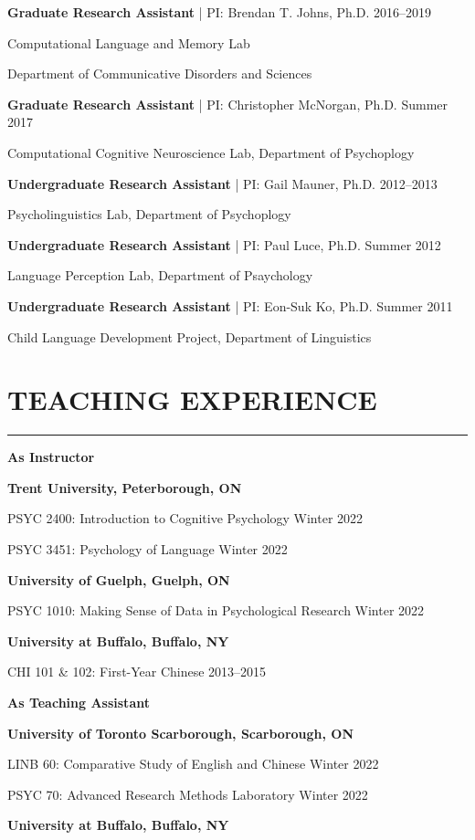 \documentclass[11pt]{article}
\newcommand{\cvsection}[1]{\vspace{-0.2cm}\section*{\Large #1}\vspace{-0.2cm}\hrule\vspace{0.2cm}}
\newcommand{\h}[1]{\hspace{15pt} #1}
\begin{document}
\textbf{Graduate Research Assistant} | PI: Brendan T. Johns, Ph.D. \hfill 2016--2019

\h{Computational Language and Memory Lab}

\h{Department of Communicative Disorders and Sciences}

\textbf{Graduate Research Assistant} | PI: Christopher McNorgan, Ph.D. \hfill Summer 2017

\h{Computational Cognitive Neuroscience Lab, Department of Psychoplogy}

\textbf{Undergraduate Research Assistant} | PI: Gail Mauner, Ph.D. \hfill 2012--2013

\h{Psycholinguistics Lab, Department of Psychoplogy}

\textbf{Undergraduate Research Assistant} | PI: Paul Luce, Ph.D. \hfill Summer 2012

\h{Language Perception Lab, Department of Psaychology}

\textbf{Undergraduate Research Assistant} | PI: Eon-Suk Ko, Ph.D. \hfill Summer 2011

\h{Child Language Development Project, Department of Linguistics}



\cvsection{TEACHING EXPERIENCE}

\textbf{\large As Instructor}

\textbf{Trent University, Peterborough, ON}

\h{PSYC 2400: Introduction to Cognitive Psychology} \hfill Winter 2022

\h{PSYC 3451: Psychology of Language} \hfill Winter 2022

\textbf{University of Guelph, Guelph, ON}

\h{PSYC 1010: Making Sense of Data in Psychological Research} \hfill Winter 2022

\textbf{University at Buffalo, Buffalo, NY}

\h{CHI 101 \& 102: First-Year Chinese} \hfill 2013--2015

\textbf{\large As Teaching Assistant}

\textbf{University of Toronto Scarborough, Scarborough, ON}

\h{LINB 60: Comparative Study of English and Chinese} \hfill Winter 2022

\h{PSYC 70: Advanced Research Methods Laboratory} \hfill Winter 2022

\textbf{University at Buffalo, Buffalo, NY}
\end{document}
